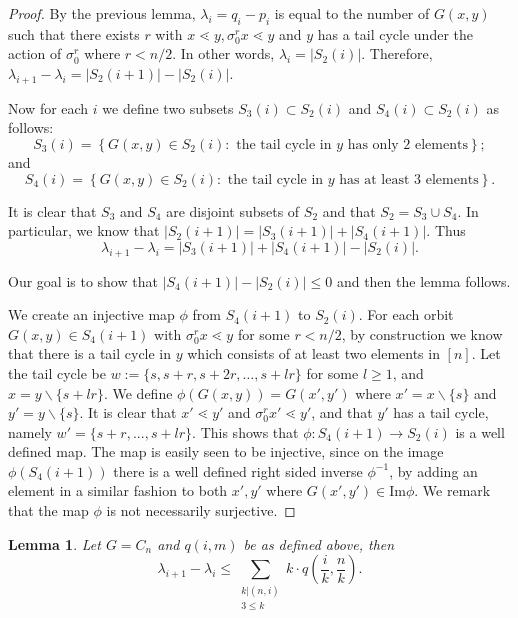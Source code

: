\documentclass[10 pt]{amsart}
\theoremstyle{plain}
\newtheorem{lem}[thm]{Lemma}
\theoremstyle{definition}
\theoremstyle{remark}
\numberwithin{equation}{section}
\newcommand\im{\text{Im}}
\begin{document}
\begin{proof}

By the previous lemma, $\lambda_i = q_i - p_i$ is equal to the number of $G(x, y)$ such that there exists $r$ with $x\lessdot y,\sigma_0^r x \lessdot y$ and $y$ has a tail cycle under the action of $\sigma_0^r$ where $r < n/2$. In other words, $\lambda_i = |S_2(i)|.$ Therefore, $\lambda_{i+1} - \lambda_i = |S_2(i+1)| - |S_2(i)|$. 

Now for each $i$ we define two subsets $S_3(i) \subset S_2(i)$ and $S_4(i) \subset S_2(i)$ as follows: 
$$S_3 (i) = \left\{ G(x, y) \in S_2(i) : \text{ the tail cycle in } y \text{ has only } 2 \text{ elements}\right\};$$ and $$S_4(i)= \left\{ G(x, y) \in S_2(i) : \text{ the tail cycle in } y \text{ has at least } 3\text{ elements}\right\}.$$  

It is clear that $S_3$ and $S_4$ are disjoint subsets of $S_2$ and that $S_2 = S_3 \cup S_4$. In particular, we know that $|S_2(i+1)| = |S_3(i+1)| +|S_4(i+1)|.$ Thus $$\lambda_{i+1} - \lambda_i = |S_3(i+1)| + |S_4(i+1)| - |S_2(i)|.$$

Our goal is to show that $|S_4(i+1) | - |S_2(i)| \le 0$ and then the lemma follows.

We create an injective map $\phi$ from $S_4(i+1)$ to $S_2(i)$. For each orbit $G(x, y) \in S_4(i+1)$ with $\sigma_0^r x \lessdot y $ for some $r < n/2$, by construction we know that there is a tail cycle in $y$ which consists of at least two elements in $[n]$. Let the tail cycle be $w := \{s,s+r,s+2r,\ldots,s+lr\}$  for some $l \ge 1$, and $x = y \backslash \{s+lr\} $. We define $\phi(G(x, y)) = G(x', y')$ where $x' = x \backslash \{s\}$ and $y' = y \backslash \{s\}$. It is clear that $x' \lessdot y'$ and $\sigma_0^r x' \lessdot y'$, and that $y'$ has a tail cycle, namely $w' = \{s+r, ..., s+lr\}$. This shows that $\phi: S_4(i+1) \rightarrow S_2(i)$ is a well defined map. The map is easily seen to be injective, since on the image $\phi(S_4(i+1))$ there is a well defined right sided inverse $\phi^{-1}$, by adding an element in a similar fashion to both $x', y'$ where $G(x', y') \in \im \phi$. We remark that the map $\phi$ is not necessarily surjective. 
\end{proof}

\begin{lem}{\label{lem:cyclic_bounding_lambda}} 
Let $G =C_n$ and $q(i,m)$ be as defined above,  then $$\lambda_{i+1} - \lambda_i \le \sum_{\substack{k | (n , i) \\ 3 \le k }} k \cdot q \left(\frac{i}{k},\frac{n}{k}\right) .$$ 
\end{lem}
\end{document}
